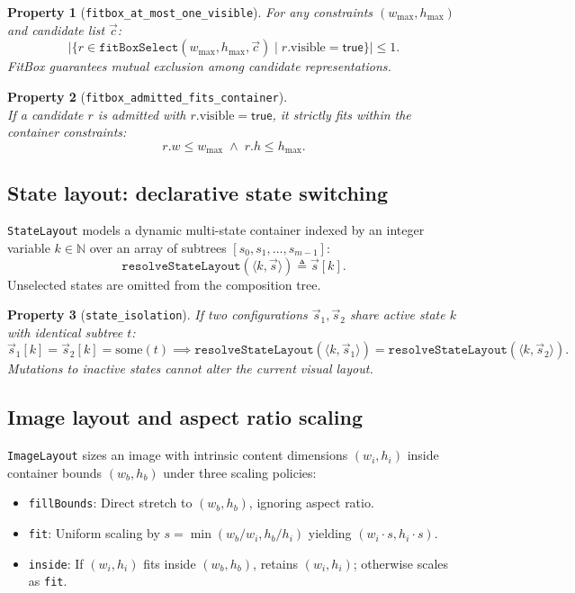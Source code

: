 \documentclass[11pt,a4paper]{article}
\newcommand{\lo}[1]{\texttt{#1}}       %
\newcommand{\jv}[1]{\texttt{#1}}       %
\theoremstyle{definition}
\theoremstyle{plain}
\newtheorem{property}{Property}[section]
\theoremstyle{remark}
\begin{document}
\begin{property}[\lo{fitbox\_at\_most\_one\_visible}]
For any constraints $(w_{\max}, h_{\max})$ and candidate list $\vec{c}$:
\[
  \bigl|\{r \in \lo{fitBoxSelect}(w_{\max}, h_{\max}, \vec{c}) \mid r.\mathrm{visible} = \textsf{true}\}\bigr| \le 1.
\]
FitBox guarantees mutual exclusion among candidate representations.
\end{property}

\begin{property}[\lo{fitbox\_admitted\_fits\_container}]
\leavevmode\\
If a candidate $r$ is admitted with $r.\mathrm{visible} = \textsf{true}$, it strictly fits
within the container constraints:
\[
  r.w \le w_{\max} \;\land\; r.h \le h_{\max}.
\]
\end{property}

\subsection{State layout: declarative state switching}
\label{sec:statelayout}

\jv{StateLayout} models a dynamic multi-state container indexed by an integer variable
$k \in \mathbb{N}$ over an array of subtrees $[s_0, s_1, \ldots, s_{m-1}]$:
\[
  \lo{resolveStateLayout}(\langle k, \vec{s} \rangle) \triangleq \vec{s}[k].
\]
Unselected states are omitted from the composition tree.

\begin{property}[\lo{state\_isolation}]
If two configurations $\vec{s}_1, \vec{s}_2$ share active state $k$ with identical subtree $t$:
\[
  \vec{s}_1[k] = \vec{s}_2[k] = \mathrm{some}(t) \implies
  \lo{resolveStateLayout}(\langle k, \vec{s}_1 \rangle) = \lo{resolveStateLayout}(\langle k, \vec{s}_2 \rangle).
\]
Mutations to inactive states cannot alter the current visual layout.
\end{property}

\subsection{Image layout and aspect ratio scaling}
\label{sec:imagelayout}

\jv{ImageLayout} sizes an image with intrinsic content dimensions $(w_i, h_i)$ inside container
bounds $(w_b, h_b)$ under three scaling policies:
\begin{itemize}
  \item \lo{fillBounds}: Direct stretch to $(w_b, h_b)$, ignoring aspect ratio.
  \item \lo{fit}: Uniform scaling by $s = \min(w_b / w_i, h_b / h_i)$ yielding $(w_i \cdot s, h_i \cdot s)$.
  \item \lo{inside}: If $(w_i, h_i)$ fits inside $(w_b, h_b)$, retains $(w_i, h_i)$; otherwise scales as \lo{fit}.
\end{itemize}
\end{document}
